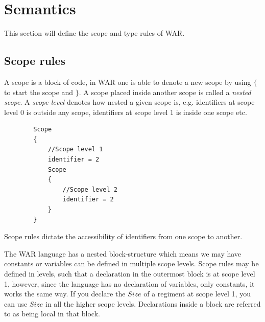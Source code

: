 \section{Semantics}
\label{sec:conanal}
This section will define the scope and type rules of WAR.
	\subsection{Scope rules}
		A scope is a block of code, in WAR one is able to denote a new scope by using $\{$ to start the scope and $\}$.
		A scope placed inside another scope is called a {\it nested scope}. A {\it scope level} denotes how nested a given scope is,
		e.g. identifiers at scope level 0 is outside any scope, identifiers at scope level 1 is inside one scope etc.
		\begin{lstlisting}
		Scope
		{
			//Scope level 1
			identifier = 2
			Scope
			{
				//Scope level 2
				identifier = 2
			}
		}
		\end{lstlisting}
		
		Scope rules dictate the accessibility of identifiers from one scope to another\cite{SPOBOG}.
	
	The WAR language has a nested block-structure which means we may have constants or variables can be defined in multiple scope levels. 
	Scope rules may be defined in levels, such that a declaration in the outermost block is at scope level 1, however, since the language has no declaration of variables, only constants, it works the same way. If you declare the $Size$ of a regiment at scope level 1, you can use $Size$ in all the higher scope levels. Declarations inside a block are referred to as being local in that block.

